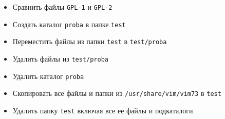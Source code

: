 \documentclass[a4paper,12pt]{article}
\begin{document}
\begin{flushleft}
\begin{enumerate}
\begin{itemize}
                \item Сравнить файлы \texttt{GPL-1} и \texttt{GPL-2}
                \item Создать каталог \texttt{proba} в папке \texttt{test}
                \item Переместить файлы из папки \texttt{test} в \texttt{test/proba}
                \item Удалить файлы из \texttt{test/proba}
                \item Удалить каталог \texttt{proba}
                \item Скопировать все файлы и папки из \texttt{/usr/share/vim/vim73} в \texttt{test}
                \item Удалить папку \texttt{test} включая все ее файлы и подкаталоги
            \end{itemize}
        \end{enumerate}
    \end{flushleft}
\end{document}
